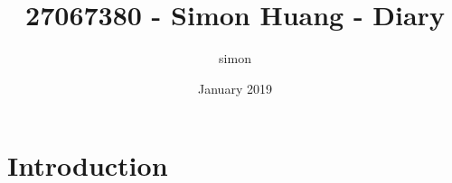 \documentclass{article}
\title{27067380 - Simon Huang - Diary}
\author{simon }
\date{January 2019}
\begin{document}
\maketitle

\section{Introduction}
\end{document}
